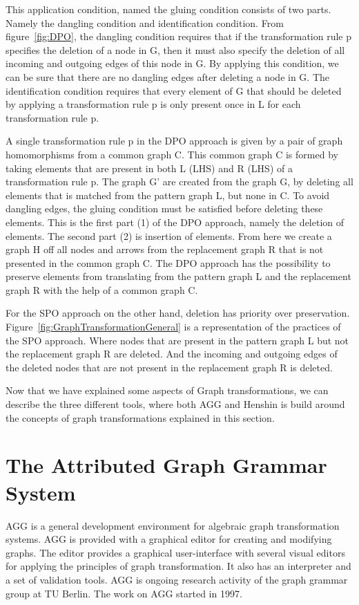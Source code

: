 \documentclass[pdftex,11pt,a4paper]{article}
\begin{document}
\noindent This application condition, named the gluing condition\cite{Loewe1997}
consists of two parts. Namely the dangling condition and identification
condition. From figure~\ref{fig:DPO}, the dangling condition requires that if
the transformation rule p specifies the deletion of a node in G, then it must also
specify the deletion of all incoming and outgoing edges of this node in G. By
applying this condition, we can be sure that there are no dangling edges after
deleting a node in G. The identification condition requires that every element
of G that should be deleted by applying a transformation rule p is only present
once in L for each transformation rule p. 

A single transformation rule p in the DPO approach is given by a pair of graph
homomorphisms from a common graph C. This common graph C is formed by taking
elements that are present in both L (LHS) and R (LHS) of a transformation rule
p. The graph G' are created from the graph G, by deleting all elements that is
matched from the pattern graph L, but none in C. To avoid dangling edges,
the gluing condition must be satisfied before deleting these elements. This is
the first part (1) of the DPO approach, namely the deletion of elements. The
second part (2) is insertion of elements. From here we create a graph H off all
nodes and arrows from the replacement graph R that is not presented in the
common graph C. The DPO approach has the possibility to preserve elements from
translating from the pattern graph L and the replacement graph R with the help
of a common graph C.

For the SPO approach on the other hand, deletion has priority over preservation.
Figure~\ref{fig:GraphTransformationGeneral} is a representation of the practices
of the SPO approach. Where nodes that are present in the pattern graph L but not
the replacement graph R are deleted. And the incoming and outgoing edges of the
deleted nodes that are not present in the replacement graph R is deleted.

Now that we have explained some aspects of Graph transformations, we can
describe the three different tools, where both AGG and Henshin is build around
the concepts of graph transformations explained in this section. 

\section{The Attributed Graph Grammar System}

\noindent AGG is a general development environment for algebraic graph
transformation systems. AGG is provided with a graphical editor for creating
and modifying graphs. The editor provides a graphical user-interface with
several visual editors for applying the principles of graph transformation. It
also has an interpreter and a set of validation tools. AGG is ongoing research
activity of the graph grammar group at TU Berlin. The work on AGG started in 1997.
\end{document}
